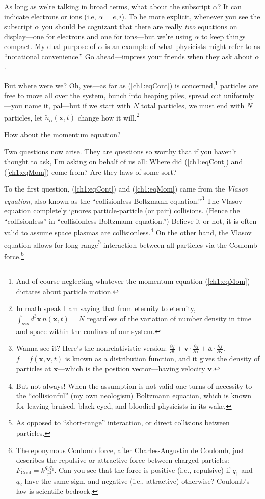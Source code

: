 As long as we're talking in broad terms, what about the subscript $\alpha$?
It can indicate electrons or ions (i.e, $\alpha = e,i$). To be more
explicit, whenever you see the subscript $\alpha$ you should be cognizant
that there are really \emph{two} equations on display---one for electrons and
one for ions---but we're using $\alpha$ to keep things compact. My
dual-purpose of $\alpha$ is an example of what physicists might refer to as
``notational convenience.'' Go ahead---impress your friends when they ask about
$\alpha$.

But where were we? Oh, yes---as far as (\ref{ch1:eqCont}) is
concerned,\footnote{And of course neglecting whatever the momentum equation
  (\ref{ch1:eqMom}) dictates about particle motion.}  particles are free to move
all over the system, bunch into heaping piles, spread out uniformly---you name
it, pal---but if we start with $N$ total particles, we must end with $N$
particles, let $\tilde n_{\alpha}(\mathbf{x},t)$ change how it will.\footnote{In
  math speak I am saying that from eternity to eternity, $\int_{\mathrm{sys}}
  d^3\mathbf{x} \, n(\mathbf{x},t) = N$ regardless of the variation of number
  density in time and space within the confines of our system.}

How about the momentum equation? 

Two questions now arise. They are questions so worthy that if you haven't
thought to ask, I'm asking on behalf of us all: Where did (\ref{ch1:eqCont}) and
(\ref{ch1:eqMom}) come from? Are they laws of some sort? 

To the first question, (\ref{ch1:eqCont}) and (\ref{ch1:eqMom}) came from the
\emph{Vlasov equation}, also known as the ``collisionless Boltzmann
equation.''\footnote{Wanna see it?  Here's the nonrelativistic version:
  $\frac{\partial f}{\partial t} + \mathbf{v} \cdot \frac{\partial f}{\partial
    \mathbf{x}} + \mathbf{a} \cdot \frac{\partial f}{\partial \mathbf{v}}$.
  $f = f (\mathbf{x}, \mathbf{v}, t)$ is known as a distribution function, and
  it gives the density of particles at $\mathbf{x}$---which is the position
  vector---having velocity $\mathbf{v}$.} The Vlasov equation completely ignores
particle-particle (or pair) collisions. (Hence the ``collisionless'' in
``collisionless Boltzmann equation.'') Believe it or not, it is often valid to
assume space plasmas are collisionless.\footnote{But not always!  When the
  assumption is not valid one turns of necessity to the ``collisionful'' (my own
  neologism) Boltzmann equation, which is known for leaving bruised, black-eyed,
  and bloodied physicists in its wake.} On the other hand, the Vlasov equation
allows for long-range\footnote{As opposed to ``short-range'' interaction, or
  direct collisions between particles.}  interaction between all particles via
the Coulomb force.\footnote{The eponymous Coulomb force, after Charles-Augustin
  de Coulomb, just describes the repulsive or attractive force between charged
  particles: $F_{\textrm{Coul}} = k \frac{q_1 q_2}{r^2}$. Can you see that the
  force is positive (i.e., repulsive) if $q_1$ and $q_2$ have the same sign, and
  negative (i.e., attractive) otherwise? Coulomb's law is scientific bedrock.}

